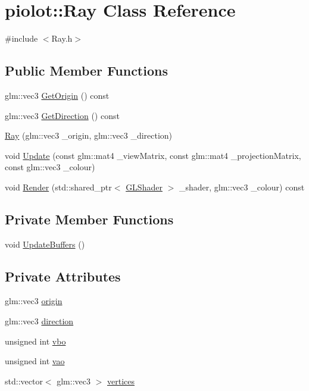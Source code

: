 \hypertarget{classpiolot_1_1_ray}{}\section{piolot\+:\+:Ray Class Reference}
\label{classpiolot_1_1_ray}


{\ttfamily \#include $<$Ray.\+h$>$}

\subsection*{Public Member Functions}
\begin{DoxyCompactItemize}
\item 
glm\+::vec3 \mbox{\hyperlink{classpiolot_1_1_ray_aaf69eb0891c1e0e884eba2475707a12e}{Get\+Origin}} () const
\item 
glm\+::vec3 \mbox{\hyperlink{classpiolot_1_1_ray_a6dc423ac6188032c31b72279c14bbe98}{Get\+Direction}} () const
\item 
\mbox{\hyperlink{classpiolot_1_1_ray_a800439dfd7597c519c4e6d5b6336a655}{Ray}} (glm\+::vec3 \+\_\+origin, glm\+::vec3 \+\_\+direction)
\item 
void \mbox{\hyperlink{classpiolot_1_1_ray_ada7c74126da4e4c8c0c7a63ae36c1ced}{Update}} (const glm\+::mat4 \+\_\+view\+Matrix, const glm\+::mat4 \+\_\+projection\+Matrix, const glm\+::vec3 \+\_\+colour)
\item 
void \mbox{\hyperlink{classpiolot_1_1_ray_a7ecae233c62860e006b474b293c1e6ca}{Render}} (std\+::shared\+\_\+ptr$<$ \mbox{\hyperlink{classpiolot_1_1_g_l_shader}{G\+L\+Shader}} $>$ \+\_\+shader, glm\+::vec3 \+\_\+colour) const
\end{DoxyCompactItemize}
\subsection*{Private Member Functions}
\begin{DoxyCompactItemize}
\item 
void \mbox{\hyperlink{classpiolot_1_1_ray_a6c21a81fd81741cca7f823e87fed1aef}{Update\+Buffers}} ()
\end{DoxyCompactItemize}
\subsection*{Private Attributes}
\begin{DoxyCompactItemize}
\item 
glm\+::vec3 \mbox{\hyperlink{classpiolot_1_1_ray_a0db15f5545f46a7cf172a6cd8010e7c4}{origin}}
\item 
glm\+::vec3 \mbox{\hyperlink{classpiolot_1_1_ray_aaef1fc006491be8684d1786d2584b5fb}{direction}}
\item 
unsigned int \mbox{\hyperlink{classpiolot_1_1_ray_a92517c7821a901e1b9c883f6635472cb}{vbo}}
\item 
unsigned int \mbox{\hyperlink{classpiolot_1_1_ray_a2b5e91b97506c618aef3b26c463f9788}{vao}}
\item 
std\+::vector$<$ glm\+::vec3 $>$ \mbox{\hyperlink{classpiolot_1_1_ray_adb40c4fbcb029550c160a892842c40cc}{vertices}}
\end{DoxyCompactItemize}


